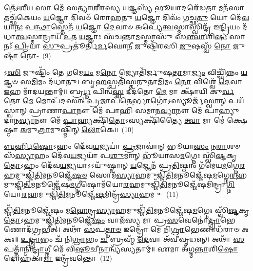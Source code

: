 𑌤𑍇᳴\-𑌽𑌶𑍀\-\ul{𑌯} 𑌸𑌾 𑌮𑍇᳴ \ul{𑌸}\-𑌤𑍍𑌯𑌾𑌶𑍀\-\ul{𑌰}\-𑌸𑍍𑌯 \ul{𑌯}\-𑌜𑍍𑌞𑌸𑍍𑌯᳴ 𑌭𑍂\-\ul{𑌯𑌾}\-𑌦𑌰𑍇᳴𑌡\-\ul{𑌤𑌾} 𑌮𑌨᳴\-\ul{𑌸𑌾} 𑌤𑌚𑍍𑌛᳴𑌕𑍇𑌯𑌂 \ul{𑌯}\-𑌜𑍍𑌞𑍋 𑌦𑌿𑌵𑍞᳴ 𑌰𑍋𑌹𑌤𑍁 \ul{𑌯}\-𑌜𑍍𑌞𑍋 𑌦𑌿𑌵𑌂᳴ 𑌗𑌚𑍍𑌛\-\ul{𑌤𑍁} 𑌯𑍋 𑌦𑍇᳴\-\ul{𑌵}\-𑌯𑌾\-\ul{𑌨𑌃} 𑌪\-\ul{𑌨𑍍𑌥𑌾}\-𑌸𑍍𑌤𑍇𑌨᳴ \ul{𑌯}\-𑌜𑍍𑌞𑍋 \ul{𑌦𑍇}\-𑌵𑌾𑍞 𑌅𑌪𑍍𑌯𑍇॑\-\ul{𑌤𑍍𑌵}\-𑌸𑍍𑌮𑌾𑌸𑍍𑌵𑌿𑌨𑍍𑌦𑍍𑌰᳴ 𑌇\-\ul{𑌨𑍍𑌦𑍍𑌰𑌿}\-𑌯𑌂 𑌦᳴𑌧𑌾\-\ul{𑌤𑍍𑌵}\-𑌸𑍍𑌮𑌾𑌨𑍍𑌰𑌾𑌯᳴ \ul{𑌉}\-𑌤 \ul{𑌯}\-𑌜𑍍𑌞𑌾𑌃 𑌸᳴𑌚𑌨𑍍𑌤𑌾\-\ul{𑌮}\-𑌸𑍍𑌮𑌾𑌸𑍁᳴ 𑌸\-\ul{𑌨𑍍𑌤𑍍𑌵𑌾}\-𑌶𑌿\-\ul{𑌷𑌃} 𑌸𑌾 𑌨𑌃᳴ \ul{𑌪𑍍𑌰𑌿}\-𑌯𑌾 \ul{𑌸𑍁}\-𑌪𑍍𑌰𑌤𑍂॑𑌰𑍍𑌤𑌿\-\ul{𑌰𑍍𑌮}\-𑌘𑍋\-\ul{𑌨𑍀} 𑌜𑍁𑌷𑍍𑌟𑌿᳴𑌰𑌸𑌿 \ul{𑌜𑍁}\-𑌷𑌸𑍍𑌵᳴ \ul{𑌨𑍋} 𑌜𑍁𑌷𑍍𑌟𑌾᳴ 𑌨𑍋-~(9)

𑌽\-\ul{𑌸𑌿} 𑌜𑍁𑌷𑍍𑌟𑌿𑌂᳴ 𑌤𑍇 𑌗𑌮𑍇\-\ul{𑌯𑌂} 𑌮\-\ul{𑌨𑍋} 𑌜𑍍𑌯𑍋𑌤𑌿᳴𑌰𑍍𑌜𑍁𑌷\-\ul{𑌤𑌾}\-𑌮𑌾\-\ul{𑌜𑍍𑌯𑌂} 𑌵𑌿𑌚𑍍𑌛𑌿᳴𑌨𑍍𑌨𑌂 \ul{𑌯}\-𑌜𑍍𑌞𑍞 𑌸\-\ul{𑌮𑌿}\-𑌮𑌂 𑌦᳴𑌧𑌾𑌤𑍁। 𑌬𑍃\-\ul{𑌹}\-𑌸𑍍𑌪𑌤𑌿᳴𑌸𑍍𑌤𑌨𑍁𑌤𑌾\-\ul{𑌮𑌿}\-𑌮𑌂 \ul{𑌨𑍋} 𑌵𑌿𑌶𑍍𑌵𑍇᳴ \ul{𑌦𑍇}\-𑌵𑌾 \ul{𑌇}\-𑌹 𑌮𑌾᳴𑌦𑌯𑌨𑍍𑌤𑌾𑌮𑍍॥ 𑌬𑍍𑌰\-\ul{𑌧𑍍𑌨} 𑌪𑌿𑌨𑍍𑌵᳴\-\ul{𑌸𑍍𑌵} 𑌦𑌦᳴𑌤𑍋 \ul{𑌮𑍇} 𑌮𑌾 𑌕𑍍𑌷𑌾᳴𑌯𑌿 𑌕𑍁\-\ul{𑌰𑍍𑌵}\-𑌤𑍋 \ul{𑌮𑍇} 𑌮𑍋𑌪᳴𑌦𑌸𑌤𑍍 \ul{𑌪𑍍𑌰}\-𑌜𑌾𑌪᳴𑌤𑍇\-\ul{𑌰𑍍𑌭𑌾}\-𑌗𑍋॑\-𑌽𑌸𑍍𑌯𑍂𑌰𑍍𑌜᳴\-\ul{𑌸𑍍𑌵𑌾}\-𑌨𑍍 𑌪𑌯᳴𑌸𑍍𑌵𑌾𑌨𑍍 𑌪𑍍𑌰𑌾𑌣𑌾\-\ul{𑌪𑌾}\-𑌨𑍗 𑌮𑍇᳴ 𑌪𑌾𑌹𑌿 𑌸𑌮𑌾𑌨\-\ul{𑌵𑍍𑌯𑌾}\-𑌨𑍗 𑌮𑍇᳴ 𑌪𑌾𑌹𑍍𑌯𑍁𑌦𑌾𑌨\-\ul{𑌵𑍍𑌯𑌾}\-𑌨𑍗 𑌮𑍇᳴ \ul{𑌪𑌾}\-𑌹𑍍𑌯𑌕𑍍𑌷𑌿᳴\-\ul{𑌤𑍋}\-\-𑌽𑌸𑍍𑌯𑌕𑍍𑌷𑌿᳴𑌤𑍍𑌯𑍈 \ul{𑌤𑍍𑌵𑌾} 𑌮𑌾 𑌮𑍇॑ 𑌕𑍍𑌷𑍇𑌷𑍍𑌠𑌾 \ul{𑌅}\-𑌮𑍁\-\ul{𑌤𑍍𑌰𑌾}\-𑌮𑍁𑌷𑍍𑌮𑌿᳴𑌨𑍍 \ul{𑌲𑍋}\-𑌕𑍇॥~(10)

{\anuvakamend[{\-\ul{𑌉}\-\-\ul{𑌪}\-\-\ul{𑌹}\-𑌵𑌂 𑌜𑍁𑌷𑍍𑌟𑌾᳴ 𑌨\-\ul{𑌸𑍍𑌤𑍍𑌵𑌾} 𑌷𑌟𑍍 𑌚᳴}]}%

\-\ul{𑌬}\-\-\ul{𑌰𑍍}\-\mbox{}𑌹𑌿\-\ul{𑌷𑍋}\-\-𑌽𑌹𑌂 𑌦𑍇᳴𑌵\-\ul{𑌯}\-𑌜𑍍𑌯𑌯𑌾॑ \ul{𑌪𑍍𑌰}\-𑌜𑌾𑌵𑌾॑𑌨𑍍 𑌭𑍂𑌯𑌾\-\ul{𑌸𑌂} 𑌨\-\ul{𑌰𑌾}\-𑌶𑍞𑌸᳴\-\ul{𑌸𑍍𑌯𑌾}\-𑌹𑌂 𑌦𑍇᳴𑌵\-\ul{𑌯}\-𑌜𑍍𑌯𑌯𑌾᳴ 𑌪\-\ul{𑌶𑍁}\-𑌮𑌾𑌨𑍍 𑌭𑍂᳴𑌯𑌾𑌸\-\ul{𑌮}\-𑌗𑍍𑌨𑍇𑌃 𑌸𑍍𑌵𑌿᳴\-\ul{𑌷𑍍𑌟}\-𑌕𑍃\-\ul{𑌤𑍋}\-\-𑌽𑌹𑌂 𑌦𑍇᳴𑌵\-\ul{𑌯}\-𑌜𑍍𑌯𑌯𑌾\-𑌽\-𑌽𑌯𑍁᳴𑌷𑍍𑌮𑌾𑌨𑍍 \ul{𑌯}\-𑌜𑍍𑌞𑍇𑌨᳴ 𑌪𑍍𑌰\-\ul{𑌤𑌿}\-𑌷𑍍𑌠𑌾𑌂 𑌗᳴𑌮𑍇𑌯\-\ul{𑌮}\-𑌗𑍍𑌨𑍇\-\ul{𑌰}\-𑌹𑌮𑍁𑌜𑍍𑌜𑌿᳴\-\ul{𑌤𑌿}\-𑌮𑌨𑍂𑌜𑍍𑌜𑍇᳴\-\ul{𑌷}\-\-\ul{𑍞} 𑌸𑍋𑌮᳴\-\-\ul{𑌸𑍍𑌯𑌾}\-\-𑌹𑌮𑍁𑌜𑍍𑌜𑌿᳴\-\ul{𑌤𑌿}\-\-𑌮𑌨𑍂𑌜𑍍𑌜𑍇᳴𑌷\-\ul{𑌮}\-𑌗𑍍𑌨𑍇\-\ul{𑌰}\-𑌹𑌮𑍁𑌜𑍍𑌜𑌿᳴\-\ul{𑌤𑌿}\-\-𑌮𑌨𑍂𑌜𑍍𑌜𑍇᳴𑌷\-\ul{𑌮}\-𑌗𑍍𑌨𑍀\-𑌷𑍋𑌮᳴𑌯𑍋\-\-\ul{𑌰}\-𑌹\-𑌮𑍁\-𑌜𑍍𑌜𑌿᳴\-\ul{𑌤𑌿}\-\-𑌮𑌨𑍂𑌜𑍍𑌜𑍇᳴𑌷\-𑌮𑌿𑌨𑍍𑌦𑍍𑌰𑌾\-\ul{𑌗𑍍𑌨𑌿}\-𑌯𑍋\-\-\ul{𑌰}\-𑌹𑌮𑍁𑌜𑍍𑌜𑌿᳴\-\ul{𑌤𑌿}\-\-𑌮𑌨𑍂𑌜𑍍𑌜𑍇᳴\-\ul{𑌷}\-\-𑌮𑌿𑌨𑍍𑌦𑍍𑌰᳴\-\ul{𑌸𑍍𑌯𑌾}\-𑌹𑌮𑍁-~(11)

𑌜𑍍𑌜𑌿᳴\-\ul{𑌤𑌿}\-𑌮𑌨𑍂𑌜𑍍𑌜𑍇᳴𑌷𑌂 𑌮\-\ul{𑌹𑍇}\-𑌨𑍍𑌦𑍍𑌰\-\ul{𑌸𑍍𑌯𑌾}\-𑌹𑌮𑍁𑌜𑍍𑌜𑌿᳴\-\ul{𑌤𑌿}\-𑌮𑌨𑍂𑌜𑍍𑌜𑍇᳴𑌷\-\ul{𑌮}\-𑌗𑍍𑌨𑍇𑌃 𑌸𑍍𑌵𑌿᳴\-\ul{𑌷𑍍𑌟}\-𑌕𑍃\-\ul{𑌤𑍋}\-\-𑌽𑌹𑌮𑍁𑌜𑍍𑌜𑌿᳴\-\ul{𑌤𑌿}\-𑌮𑌨𑍂𑌜𑍍𑌜𑍇᳴\-\ul{𑌷𑌂} 𑌵𑌾𑌜᳴𑌸𑍍𑌯 𑌮𑌾 𑌪𑍍𑌰\-\ul{𑌸}\-𑌵𑍇𑌨𑍋॑\-\ul{𑌦𑍍𑌗𑍍𑌰𑌾}\-𑌭𑍇𑌣𑍋𑌦᳴𑌗𑍍𑌰𑌭𑍀𑌤𑍍। 𑌅𑌥𑌾᳴ \ul{𑌸}\-𑌪\-\ul{𑌤𑍍𑌨𑌾}\-\-\ul{𑍞} 𑌇𑌨𑍍𑌦𑍍𑌰𑍋᳴ 𑌮𑍇 𑌨𑌿\-\ul{𑌗𑍍𑌰𑌾}\-𑌭𑍇𑌣𑌾𑌧᳴𑌰𑌾𑍞 𑌅𑌕𑌃॥ \ul{𑌉}\-\-\ul{𑌦𑍍𑌗𑍍𑌰𑌾}\-𑌭𑌂 𑌚᳴ 𑌨𑌿\-\ul{𑌗𑍍𑌰𑌾}\-𑌭𑌂 \ul{𑌚} 𑌬𑍍𑌰𑌹𑍍𑌮᳴ \ul{𑌦𑍇}\-𑌵𑌾 𑌅᳴𑌵𑍀𑌵𑍃𑌧𑌨𑍍𑌨𑍍। 𑌅𑌥𑌾᳴ \ul{𑌸}\-𑌪𑌤𑍍𑌨𑌾᳴𑌨𑌿\-\ul{𑌨𑍍𑌦𑍍𑌰𑌾}\-𑌗𑍍𑌨𑍀 𑌮𑍇᳴ 𑌵𑌿\-\ul{𑌷𑍂}\-𑌚𑍀\-\ul{𑌨𑌾}\-𑌨𑍍𑌵𑍍𑌯᳴𑌸𑍍𑌯𑌤𑌾𑌮𑍍॥ 𑌏𑌮𑌾 𑌅᳴𑌗𑍍𑌮\-\ul{𑌨𑍍𑌨𑌾}\-𑌶𑌿\-\ul{𑌷𑍋} 𑌦𑍋𑌹᳴𑌕𑌾\-\ul{𑌮𑌾} 𑌇𑌨𑍍𑌦𑍍𑌰᳴𑌵𑌨𑍍𑌤𑍋~(12)


